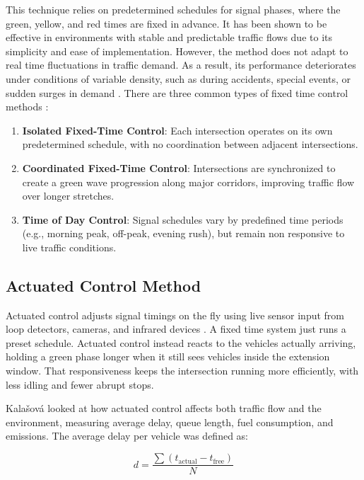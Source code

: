 ﻿\documentclass[11pt, a4paper]{report}
\begin{document}
This technique relies on predetermined schedules for signal phases, where the green, yellow, and red times are fixed in advance. It has been shown to be effective in environments with stable and predictable traffic flows due to its simplicity and ease of implementation. However, the method does not adapt to real time fluctuations in traffic demand. As a result, its performance deteriorates under conditions of variable density, such as during accidents, special events, or sudden surges in demand \cite{michailidis2025traffic}. There are three common types of fixed time control methods \cite{tang2019global}:

\begin{enumerate}
    \item \textbf{Isolated Fixed-Time Control}: Each intersection operates on its own predetermined schedule, with no coordination between adjacent intersections.
    \item \textbf{Coordinated Fixed-Time Control}: Intersections are synchronized to create a green wave progression along major corridors, improving traffic flow over longer stretches.
    \item \textbf{Time of Day Control}: Signal schedules vary by predefined time periods (e.g., morning peak, off-peak, evening rush), but remain non responsive to live traffic conditions.
\end{enumerate}

\subsection{Actuated Control Method}

Actuated control adjusts signal timings on the fly using live sensor input from loop detectors, cameras, and infrared devices \cite{kalavsova2022impact}. A fixed time system just runs a preset schedule. Actuated control instead reacts to the vehicles actually arriving, holding a green phase longer when it still sees vehicles inside the extension window. That responsiveness keeps the intersection running more efficiently, with less idling and fewer abrupt stops.

Kalašová \cite{kalavsova2022impact} looked at how actuated control affects both traffic flow and the environment, measuring average delay, queue length, fuel consumption, and emissions. The average delay per vehicle was defined as:

\begin{equation}
d = \frac{\sum (t_{\text{actual}} - t_{\text{free}})}{N}
\label{eq:average-delay}
\end{equation}
\end{document}
